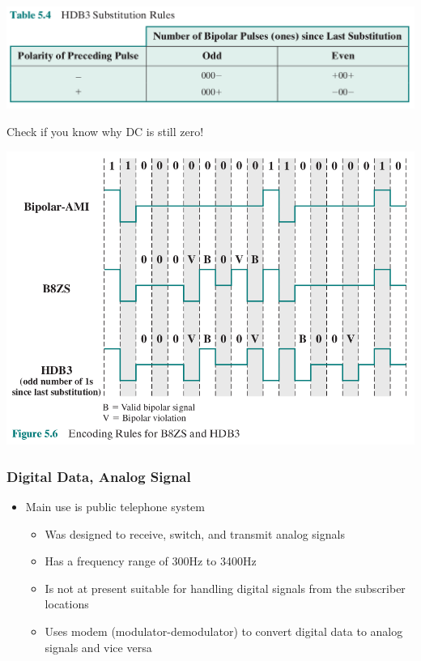 \documentclass[pdflatex,compress]{beamer}
\begin{document}
\begin{frame}
	\begin{center}
		\includegraphics[width=\linewidth]{img/img09}
	\end{center}
	Check if you know why DC is still zero!
\end{frame}

\begin{frame}
	\begin{center}
		\includegraphics[width=0.9\linewidth]{img/img10}
	\end{center}
\end{frame}

\begin{frame}
	\frametitle{Digital Data, Analog Signal}
	\begin{itemize}
		\item Main use is public telephone system
		\begin{itemize}
			\item Was designed to receive, switch, and transmit analog signals
			\item Has a frequency range of 300Hz to 3400Hz
			\item Is not at present suitable for handling digital signals from the subscriber locations
			\item Uses modem (modulator-demodulator) to convert digital data to analog signals and vice versa
		\end{itemize}
	\end{itemize}
\end{frame}
\end{document}
